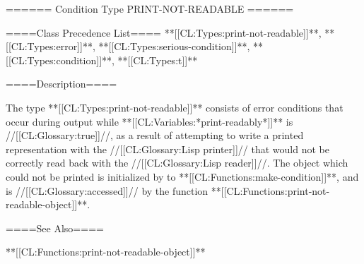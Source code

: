 ====== Condition Type PRINT-NOT-READABLE ======

====Class Precedence List==== **[[CL:Types:print-not-readable]]**, **[[CL:Types:error]]**, **[[CL:Types:serious-condition]]**, **[[CL:Types:condition]]**, **[[CL:Types:t]]**

====Description====

The type **[[CL:Types:print-not-readable]]** consists of error conditions that occur during output while **[[CL:Variables:*print-readably*]]** is //[[CL:Glossary:true]]//, as a result of attempting to write a printed representation with the //[[CL:Glossary:Lisp printer]]// that would not be correctly read back with the //[[CL:Glossary:Lisp reader]]//. The object which could not be printed is initialized by  to **[[CL:Functions:make-condition]]**, and is //[[CL:Glossary:accessed]]// by the function **[[CL:Functions:print-not-readable-object]]**.

====See Also====

**[[CL:Functions:print-not-readable-object]]**


